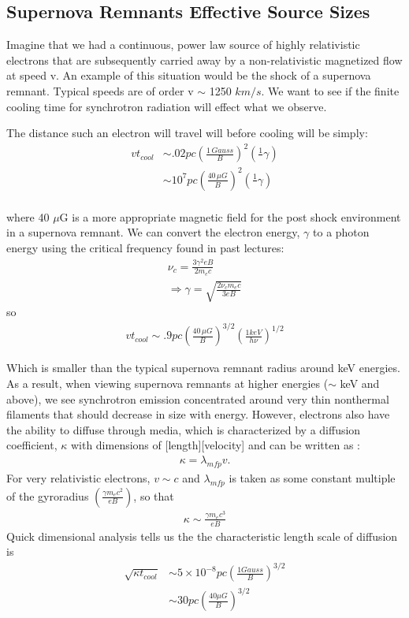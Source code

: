 \documentclass{article}
\def\inv#1{\frac1{#1}}
\def\inv#1{{\frac{1}{}#1}}
\begin{document}
\subsection{Supernova Remnants Effective Source Sizes}

Imagine that we had a continuous, power law source of highly relativistic electrons that are subsequently carried away by a non-relativistic magnetized flow at speed v.  An example of this situation would be the shock of a supernova remnant.  Typical speeds are of order v $\sim$ 1250 $km/s$. We want to see if the finite cooling time for synchrotron radiation will effect what we observe.

The distance such an electron will travel will before cooling will be simply: 
$$\begin{aligned}vt_{cool}&\sim.02 pc\left(\frac{1\,Gauss}{ B}\right)^2\left(\inv{\gamma}\right)\\  
&\sim 10^{7} pc\left(\frac{40\,\mu G}{ B}\right)^2\left(\inv{\gamma}\right)\\ \end{aligned}$$

where 40 $\mu$G is a more appropriate magnetic field for the post shock environment in a supernova remnant.  We can convert the electron energy, $\gamma$ to a photon energy using the critical frequency found in past lectures: 
$$\begin{aligned}\nu_c = \frac{3\gamma^{2}eB}{2 m_e c}\\
\Rightarrow \gamma = \sqrt{\frac{2\nu_c m_e c}{3 e B}}\end{aligned}$$
so 
$$\begin{aligned} vt_{cool} \sim .9 pc\left(\frac{40\,\mu G}{ B}\right)^{3/2}\left(\frac{1 keV }{ h\nu}\right)^{1/2}\end{aligned}$$

Which is smaller than the typical supernova remnant radius around keV energies. As a result, when viewing supernova remnants at higher energies ($\sim$ keV and above), we see synchrotron emission concentrated around very thin nonthermal filaments that should decrease in size with energy. However, electrons also have the ability to diffuse through media, which is characterized by a diffusion coefficient, $\kappa$ with dimensions of [length][velocity] and can be written as :
$$\begin{aligned}
\kappa = \lambda_{mfp} v.
\end{aligned}$$
For very relativistic electrons, $v\sim c$ and $\lambda_{mfp}$ is taken as some constant multiple of the gyroradius $\left(\frac{\gamma m_e c^2}{e B}\right)$, so that 
$$\begin{aligned}
\kappa \sim \frac{\gamma m_e c^3}{e B}
\end{aligned}$$
Quick dimensional analysis tells us the the characteristic length scale of diffusion is 
 $$\begin{aligned}
\sqrt{\kappa t_{cool}} &\sim 5 \times 10^{-8} pc\left(\frac{1 Gauss}{B}\right)^{3/2}
\\ &\sim 30 pc \left(\frac{40 \mu G}{B}\right)^{3/2}
\end{aligned}$$ 
\end{document}
